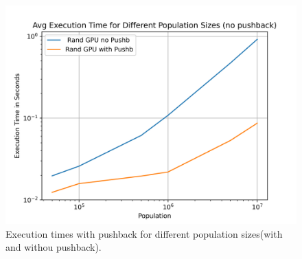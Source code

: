 \documentclass[12pt,a4paper]{article}
\begin{document}
\begin{figure}[H]
    \centering
    \includegraphics[width=12cm]{../Population_no_push.png}
    \caption{Execution times with pushback for different population sizes(with and withou pushback).}
    \label{fig:population_no_push}
\end{figure}
\end{document}

